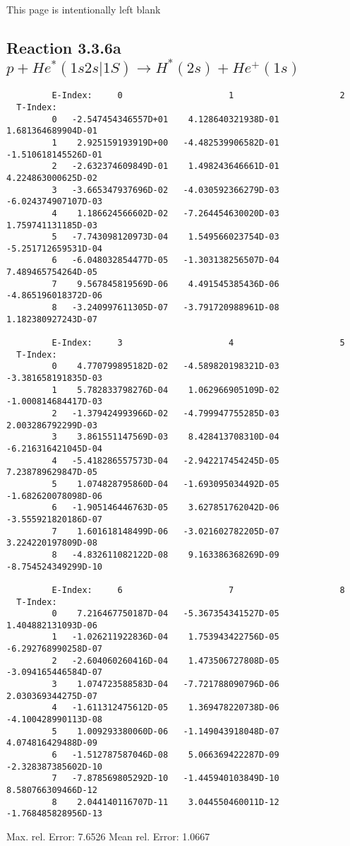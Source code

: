 \newpage
This page is intentionally left blank
\newpage
\subsection{
Reaction 3.3.6a  $ p + He^*(1s2s|1S) \rightarrow H^*(2s) + He^+(1s) $
}


\begin{verbatim}
         E-Index:     0                     1                     2
  T-Index:
         0   -2.547454346557D+01    4.128640321938D-01    1.681364689904D-01
         1    2.925159193919D+00   -4.482539906582D-01   -1.510618145526D-01
         2   -2.632374609849D-01    1.498243646661D-01    4.224863000625D-02
         3   -3.665347937696D-02   -4.030592366279D-03   -6.024374907107D-03
         4    1.186624566602D-02   -7.264454630020D-03    1.759741131185D-03
         5   -7.743098120973D-04    1.549566023754D-03   -5.251712659531D-04
         6   -6.048032854477D-05   -1.303138256507D-04    7.489465754264D-05
         7    9.567845819569D-06    4.491545385436D-06   -4.865196018372D-06
         8   -3.240997611305D-07   -3.791720988961D-08    1.182380927243D-07

         E-Index:     3                     4                     5
  T-Index:
         0    4.770799895182D-02   -4.589820198321D-03   -3.381658191835D-03
         1    5.782833798276D-04    1.062966905109D-02   -1.000814684417D-03
         2   -1.379424993966D-02   -4.799947755285D-03    2.003286792299D-03
         3    3.861551147569D-03    8.428413708310D-04   -6.216316421045D-04
         4   -5.418286557573D-04   -2.942217454245D-05    7.238789629847D-05
         5    1.074828795860D-04   -1.693095034492D-05   -1.682620078098D-06
         6   -1.905146446763D-05    3.627851762042D-06   -3.555921820186D-07
         7    1.601618148499D-06   -3.021602782205D-07    3.224220197809D-08
         8   -4.832611082122D-08    9.163386368269D-09   -8.754524349299D-10

         E-Index:     6                     7                     8
  T-Index:
         0    7.216467750187D-04   -5.367354341527D-05    1.404882131093D-06
         1   -1.026211922836D-04    1.753943422756D-05   -6.292768990258D-07
         2   -2.604060260416D-04    1.473506727808D-05   -3.094165446584D-07
         3    1.074723588583D-04   -7.721788090796D-06    2.030369344275D-07
         4   -1.611312475612D-05    1.369478220738D-06   -4.100428990113D-08
         5    1.009293380060D-06   -1.149043918048D-07    4.074816429488D-09
         6   -1.512787587046D-08    5.066369422287D-09   -2.328387385602D-10
         7   -7.878569805292D-10   -1.445940103849D-10    8.580766309466D-12
         8    2.044140116707D-11    3.044550460011D-12   -1.768485828956D-13

\end{verbatim}
  Max. rel. Error:   7.6526 %
  Mean rel. Error:   1.0667 %

